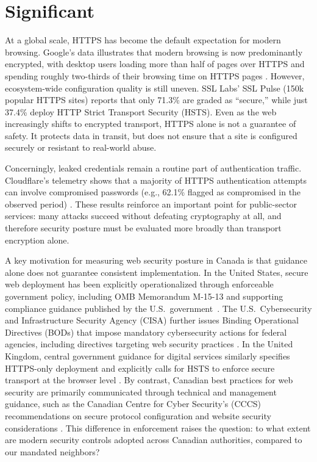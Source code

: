 \documentclass[conference]{IEEEtran}
\begin{document}
\section{Significant}

At a global scale, HTTPS has become the default expectation for modern browsing. Google’s data
illustrates that modern browsing is now predominantly encrypted, with desktop users loading more than half of pages
over HTTPS and spending roughly two-thirds of their browsing time on HTTPS pages \cite{GoogleTransparencyHTTPS}.
However, ecosystem-wide configuration quality is still uneven. SSL Labs’ SSL Pulse (150k popular HTTPS sites)
reports that only 71.3\% are graded as ``secure,'' while just 37.4\% deploy HTTP Strict Transport Security (HSTS)\cite{SSLPulse}. 
Even as the web increasingly shifts to encrypted
transport, HTTPS alone is not a guarantee of safety. It protects data in transit, but does not ensure that a
site is configured securely or resistant to real-world abuse.

Concerningly, leaked credentials remain a routine part of authentication traffic. Cloudflare’s 
telemetry shows that a majority of HTTPS authentication
attempts can involve compromised passwords (e.g., 62.1\% flagged as compromised in the observed period)
\cite{CloudflareRadarAppLayer}. These results reinforce an important point for public-sector services:
many attacks succeed without defeating cryptography at all, and therefore security posture must be evaluated
more broadly than transport encryption alone.

A key motivation for measuring web security posture in Canada is that guidance alone does not guarantee
consistent implementation. In the United States, secure web deployment
has been explicitly operationalized through enforceable government policy, including OMB Memorandum M-15-13 
and supporting compliance guidance published by the
U.S.\ government~\cite{omb-m-15-13,uscio-https-guide}. The U.S.\ Cybersecurity and Infrastructure Security Agency
(CISA) further issues Binding Operational Directives (BODs) that impose mandatory cybersecurity actions for
federal agencies, including directives targeting web security practices
\cite{cisa_bod_18_01}. In the United Kingdom, central government guidance for digital services similarly specifies
HTTPS-only deployment and explicitly calls for HSTS to enforce secure transport at the browser level
\cite{uk-using-https-service-manual}. By contrast, Canadian best practices for web security are primarily
communicated through technical and management guidance, such as the Canadian Centre for Cyber Security’s (CCCS)
recommendations on secure protocol configuration and website security considerations
\cite{cccs-itsp-40062,cccs-itsm-60005}. This difference in enforcement raises the question: 
to what extent are modern security controls adopted across Canadian authorities, compared to our mandated neighbors?
\end{document}
